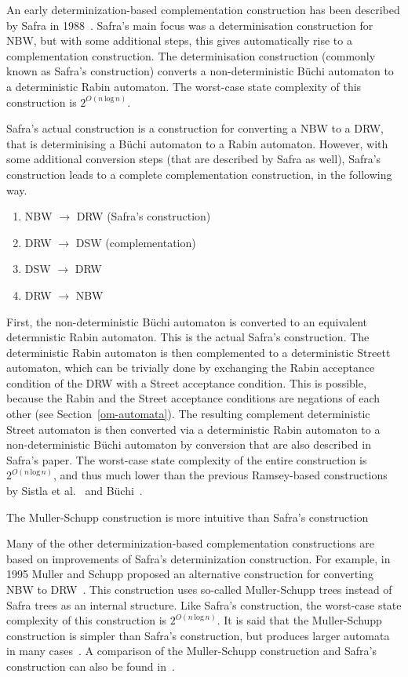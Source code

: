 An early determinization-based complementation construction has been described by Safra in 1988~\cite{1988_safra_2}. Safra's main focus was a determinisation construction for NBW, but with some additional steps, this gives automatically rise to a complementation construction. The determinisation construction (commonly known as Safra's construction) converts a non-deterministic Büchi automaton to a deterministic Rabin automaton. The worst-case state complexity of this construction is $2^{O\left(n\, \text{log} \, n\right)}$. 

 Safra's actual construction is a construction for converting a NBW to a DRW, that is determinising a Büchi automaton to a Rabin automaton. However, with some additional conversion steps (that are described by Safra as well), Safra's construction leads to a complete complementation construction, in the following way. 
\begin{enumerate}
\item NBW $\longrightarrow$ DRW (Safra's construction)
\item DRW $\longrightarrow$ DSW (complementation)
\item DSW $\longrightarrow$ DRW
\item DRW $\longrightarrow$ NBW
\end{enumerate}

First, the non-deterministic Büchi automaton is converted to an equivalent determnistic Rabin automaton. This is the actual Safra's construction. The deterministic Rabin automaton is then complemented to a deterministic Streett automaton, which can be trivially done by exchanging the Rabin acceptance condition of the DRW with a Street acceptance condition. This is possible, because the Rabin and the Street acceptance conditions are negations of each other (see Section~\ref{om-automata}). The resulting complement deterministic Street automaton is then converted via a deterministic Rabin automaton to a non-deterministic Büchi automaton by conversion that are also described in Safra's paper. The worst-case state complexity of the entire construction is $2^{O\left(n\, \text{log} \, n\right)}$, and thus much lower than the previous Ramsey-based constructions by Sistla et al.~\cite{PrasadSistla1987217} and Büchi~\cite{buchi1960decision}.

The Muller-Schupp construction is more intuitive than Safra's construction~\cite{2002_roggenbach}

Many of the other determinization-based complementation constructions are based on improvements of Safra's determinization construction. For example, in 1995 Muller and Schupp proposed an alternative construction for converting NBW to DRW~\cite{Muller199569}. This construction uses so-called Muller-Schupp trees instead of Safra trees as an internal structure. Like Safra's construction, the worst-case state complexity of this construction is $2^{O\left(n\, \text{log} \, n\right)}$. It is said that the Muller-Schupp construction is simpler than Safra's construction, but produces larger automata in many cases~\cite{2006_althoff}. A comparison of the Muller-Schupp construction and Safra's construction can also be found in~\cite{2006_althoff}.

